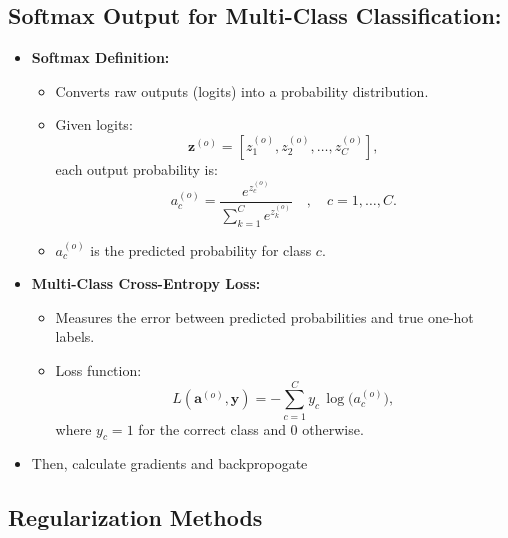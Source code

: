 \documentclass{article}
\begin{document}
\subsection{Softmax Output for Multi-Class Classification:}
\begin{itemize}
    \item \textbf{Softmax Definition:}
    \begin{itemize}
        \item Converts raw outputs (logits) into a probability distribution.
        \item Given logits:
        \[
        \mathbf{z}^{(o)} = [z_1^{(o)}, z_2^{(o)}, \ldots, z_C^{(o)}],
        \]
        each output probability is:
        \[
        a_c^{(o)} = \frac{e^{z_c^{(o)}}}{\sum_{k=1}^{C} e^{z_k^{(o)}}} \quad,\quad c = 1, \ldots, C.
        \]
        \item \(a_c^{(o)}\) is the predicted probability for class \(c\).
    \end{itemize}
    \item \textbf{Multi-Class Cross-Entropy Loss:}
    \begin{itemize}
        \item Measures the error between predicted probabilities and true one-hot labels.
        \item Loss function:
        \[
        L(\mathbf{a}^{(o)}, \mathbf{y}) = -\sum_{c=1}^{C} y_c \, \log\bigl(a_c^{(o)}\bigr),
        \]
        where \(y_c = 1\) for the correct class and \(0\) otherwise.
    \end{itemize}
    \item Then, calculate gradients and backpropogate\end{itemize}

\subsection{Regularization Methods}
\end{document}
